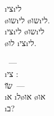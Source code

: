 \begin{twocol}
\begin{stanza}
 \i{צי}\i{לי}\\
\o{שו}\i{לי} \o{שו}\i{לי}.\\
\i{צי}\i{לי} \o{שו}\i{לי}\\
\o{לו}  \i{צי}\i{לי}.
\end{stanza}

\begin{stanza}
~—\\
\i{צי}  :\\
   \u{שו}~—\\
\i{א}  \i{ל}\o{או} \o{או}\\
\i{ב}?
\end{stanza}
\end{twocol}

